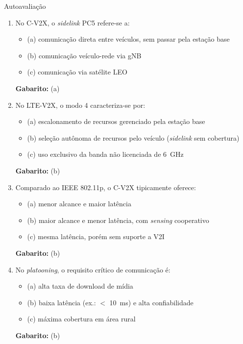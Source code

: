 \documentclass[aspectratio=169,11pt]{beamer}
\begin{document}
\begin{frame}{Autoavaliação}
  \begin{enumerate}
    \item No C-V2X, o \emph{sidelink} PC5 refere-se a:
      \begin{itemize}
        \item (a) comunicação direta entre veículos, sem passar pela estação base
        \item (b) comunicação veículo-rede via gNB
        \item (c) comunicação via satélite LEO
      \end{itemize}
      \pause
      \textbf{Gabarito:} (a)
    \item No LTE-V2X, o modo 4 caracteriza-se por:
      \begin{itemize}
        \item (a) escalonamento de recursos gerenciado pela estação base
        \item (b) seleção autônoma de recursos pelo veículo (\emph{sidelink} sem cobertura)
        \item (c) uso exclusivo da banda não licenciada de 6~GHz
      \end{itemize}
      \pause
      \textbf{Gabarito:} (b)
    \item Comparado ao IEEE 802.11p, o C-V2X tipicamente oferece:
      \begin{itemize}
        \item (a) menor alcance e maior latência
        \item (b) maior alcance e menor latência, com \emph{sensing} cooperativo
        \item (c) mesma latência, porém sem suporte a V2I
      \end{itemize}
      \pause
      \textbf{Gabarito:} (b)
    \item No \emph{platooning}, o requisito crítico de comunicação é:
      \begin{itemize}
        \item (a) alta taxa de download de mídia
        \item (b) baixa latência (ex.: $<$ 10~ms) e alta confiabilidade
        \item (c) máxima cobertura em área rural
      \end{itemize}
      \pause
      \textbf{Gabarito:} (b)
  \end{enumerate}
\end{frame}
\end{document}
